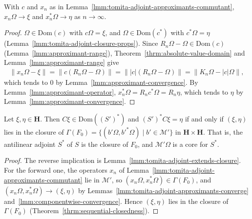 \begin{lemma}
    \label{lmm:tomita-adjoint-approximants-converge}
    \leanok
    With $c$ and $x_n$ as in Lemma~\ref{lmm:tomita-adjoint-approximants-commutant}, $x_n\Omega \to \xi$ and $x_n^*\Omega \to \eta$ as $n \to \infty$.
\end{lemma}
\begin{proof}
    \leanok
    $\Omega \in \text{Dom}(c)$ with $c\Omega = \xi$, and $\Omega \in \text{Dom}(c^*)$ with $c^*\Omega = \eta$ (Lemma~\ref{lmm:tomita-adjoint-closure-props}). Since $R_n\Omega - \Omega \in \text{Dom}(c)$ (Lemma~\ref{lmm:approximant-range}), Theorem~\ref{thrm:absolute-value-domain} and Lemma~\ref{lmm:approximant-range} give
    \begin{align}
        \|x_n\Omega - \xi\| = \|c(R_n\Omega - \Omega)\| = \||c|(R_n\Omega - \Omega)\| = \|K_n\Omega - |c|\Omega\|,
    \end{align}
    which tends to $0$ by Lemma~\ref{lmm:approximant-convergence}. By Lemma~\ref{lmm:approximant-operator}, $x_n^*\Omega = R_nc^*\Omega = R_n\eta$, which tends to $\eta$ by Lemma~\ref{lmm:approximant-convergence}.
\end{proof}

\begin{theorem}[$S^* = \overline{F_0}$]
    \label{thrm:tomita-adjoint-eq-closure}
    \leanok
    Let $\xi, \eta \in \mathbf{H}$. Then $C\xi \in \text{Dom}((S')^*)$ and $(S')^*C\xi = \eta$ if and only if $(\xi, \eta)$ lies in the closure of $\Gamma(F_0) = \{ (b'\Omega, b'^*\Omega) \mid b' \in \mathcal{M}' \}$ in $\mathbf{H} \times \mathbf{H}$. That is, the antilinear adjoint $S^*$ of $S$ is the closure of $F_0$, and $\mathcal{M}'\Omega$ is a core for $S^*$.
\end{theorem}
\begin{proof}
    \leanok
    The reverse implication is Lemma~\ref{lmm:tomita-adjoint-extends-closure}. For the forward one, the operators $x_n$ of Lemma~\ref{lmm:tomita-adjoint-approximants-commutant} lie in $\mathcal{M}'$, so $(x_n\Omega, x_n^*\Omega) \in \Gamma(F_0)$, and $(x_n\Omega, x_n^*\Omega) \to (\xi, \eta)$ by Lemmas~\ref{lmm:tomita-adjoint-approximants-converge} and~\ref{lmm:componentwise-convergence}. Hence $(\xi, \eta)$ lies in the closure of $\Gamma(F_0)$ (Theorem~\ref{thrm:sequential-closedness}).
\end{proof}

